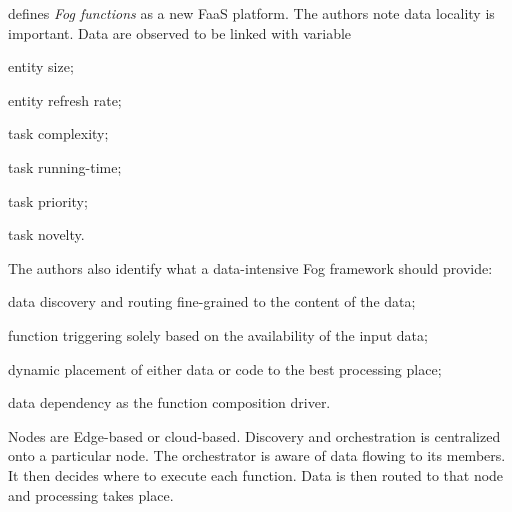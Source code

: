 \begin{description}[leftmargin=10pt]
	\item[\citet{cheng_fog_2019}] defines \textit{Fog functions} as a new \gls{FaaS} platform. The authors note data locality is important. Data are observed to be linked with variable
		\begin{enumerate*}[(i)]
			\item entity size;
			\item entity refresh rate;
			\item task complexity;
			\item task running-time;
			\item task priority;
			\item task novelty.
		\end{enumerate*}
		The authors also identify what a data-intensive Fog framework should provide:
		\begin{enumerate*}[(a)]
			\item data discovery and routing fine-grained to the content of the data;
			\item function triggering solely based on the availability of the input data;
			\item dynamic placement of either data or code to the best processing place;
			\item data dependency as the function composition driver.
		\end{enumerate*}
		Nodes are Edge-based or cloud-based. Discovery and orchestration is centralized onto a particular node. The orchestrator is aware of data flowing to its members. It then decides where to execute each function. Data is then routed to that node and processing takes place.


\end{description}
